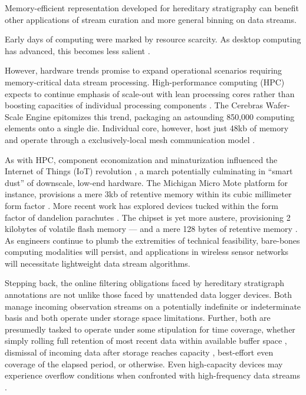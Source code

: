 Memory-efficient representation developed for hereditary stratigraphy can benefit other applications of stream curation and more general binning on data streams.

Early days of computing were marked by resource scarcity.
As desktop computing has advanced, this becomes less salient \citep{kushida2015cloud}.

However, hardware trends promise to expand operational scenarios requiring memory-critical data stream processing.
High-performance computing (HPC) expects to continue emphasis of scale-out with lean processing cores rather than boosting capacities of individual processing components \citep{sutter2005free,morgenstern2021unparalleled}.
The Cerebras Wafer-Scale Engine epitomizes this trend, packaging an astounding 850,000 computing elements onto a single die.
Individual core, however, host just 48kb of memory and operate through a exclusively-local mesh communication model \citep{cerebras2021wafer,lauterbach2021path}.

As with HPC, component economization and minaturization influenced the Internet of Things (IoT) revolution \citep{rfc7228,ojo2018review}, a march potentially culminating in ``smart dust'' \citep{warneke2001smart} of downscale, low-end hardware.
The Michigan Micro Mote platform for instance, provisions a mere 3kb of retentive memory within its cubic millimeter form factor \citep{lee2012modular}.
More recent work has explored devices tucked within the form factor of dandelion parachutes \citep{iyer2022wind}.
The chipset is yet more austere, provisioning 2 kilobytes of volatile flash memory --- and a mere 128 bytes of retentive memory \citep{microchip2014atiny20}.
As engineers continue to plumb the extremities of technical feasibility, bare-bones computing modalities will persist, and applications in wireless sensor networks will necessitate lightweight data stream algorithms.

Stepping back, the online filtering obligations faced by hereditary stratigraph annotations are not unlike those faced by unattended data logger devices.
Both manage incoming observation streams on a potentially indefinite or indeterminate basis and both operate under storage space limitations.
Further, both are presumedly tasked to operate under some stipulation for time coverage, whether simply rolling full retention of most recent data within available buffer space \citep{fincham1995use}, dismissal of incoming data after storage reaches capacity \citep{saunders1989portable,mahzan2017design}, best-effort even coverage of the elapsed period, or otherwise.
Even high-capacity devices may experience overflow conditions when confronted with high-frequency data streams \citep{luharuka2003design}.

